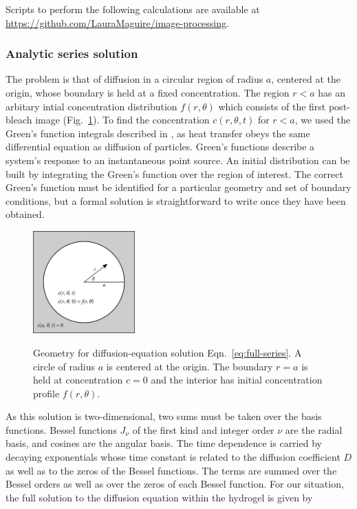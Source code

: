 Scripts to perform the following calculations are available at \url{https://github.com/LauraMaguire/image-processing}.

\subsubsection{Analytic series solution}

The problem is that of diffusion in a circular region of radius $a$, centered at the origin, whose boundary is held at a fixed concentration.  The region $r<a$ has an arbitary intial concentration distribution $f(r,\theta)$ which consists of the first post-bleach image (Fig.~\ref{fig:carslaw-geo}).  To find the concentration $c(r,\theta,t)$ for $r<a$, we used the Green's function integrals described in \cite{h.s.carslaw59}, as heat transfer obeys the same differential equation as diffusion of particles.  Green's functions describe a system's response to an instantaneous point source.  An initial distribution can be built by integrating the Green's function over the region of interest.  The correct Green's function must be identified for a particular geometry and set of boundary conditions, but a formal solution is straightforward to write once they have been obtained.

\begin{figure}
\caption[Geometry for Fourier transform solution.]{Geometry for diffusion-equation solution Eqn.~\ref{eq:full-series}.  A circle of radius $a$ is centered at the origin.  The boundary $r=a$ is held at concentration $c=0$ and the interior has initial concentration profile $f(r,\theta)$.}
\centering
\includegraphics[width=0.35\textwidth]{figs/ch04/carslaw-geometry}
\label{fig:carslaw-geo}
\end{figure} 

As this solution is two-dimensional, two sums must be taken over the basis functions.  Bessel functions $J_\nu$ of the first kind and integer order $\nu$ are the radial basis, and cosines are the angular basis.  The time dependence is carried by decaying exponentials whose time constant is related to the diffusion coefficient $D$ as well as to the zeros of the Bessel functions.  The terms are summed over the Bessel orders as well as over the zeros of each Bessel function.  For our situation, the full solution to the diffusion equation within the hydrogel is given by \cite{h.s.carlslaw59}

